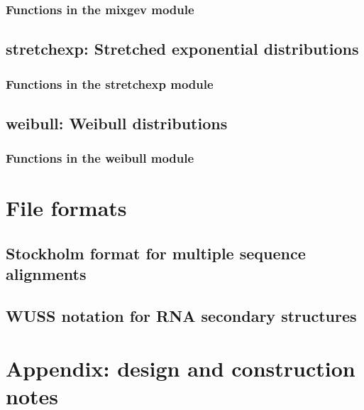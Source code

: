 \documentclass[11pt]{book}
\begin{document}
\subsection{Functions in the mixgev module}


\newpage
\section{stretchexp: Stretched exponential distributions}

\subsection{Functions in the stretchexp module}


\newpage
\section{weibull: Weibull distributions}

\subsection{Functions in the weibull module}







\newpage
\chapter{File formats}

\section{Stockholm format for multiple sequence alignments}




\newpage
\section{WUSS notation for RNA secondary structures}




\newpage
\chapter{Appendix: design and construction notes}




\newpage
\newcommand{\bibfont}{\footnotesize}


\end{document}

